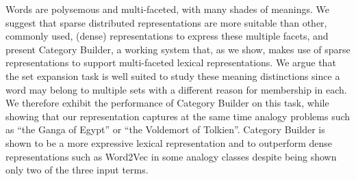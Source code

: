 Words are polysemous and multi-faceted, with many shades of meanings. We suggest that sparse distributed representations are more suitable than other, commonly used, (dense) representations to express these multiple facets, and present Category Builder, a working system that, as we show, makes use of sparse representations to support multi-faceted lexical representations. We argue that the set expansion task is well suited to study these meaning distinctions since a word may belong to multiple sets with a different reason for membership in each. We therefore exhibit the performance of Category Builder on this task, while showing that our representation captures at the same time analogy problems such as ``the Ganga of Egypt'' or ``the Voldemort of Tolkien''. Category Builder is shown to be a more expressive lexical representation and to outperform dense representations such as Word2Vec in some analogy classes despite being shown only two of the three input terms.

